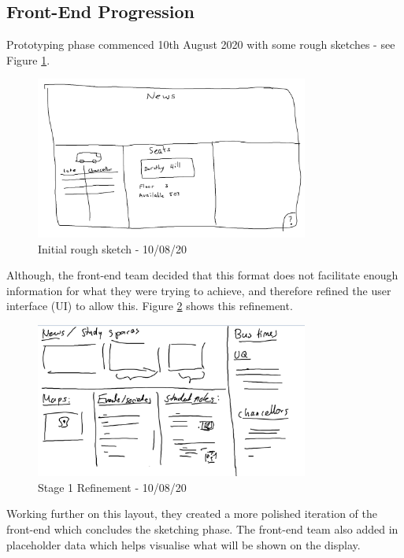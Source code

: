 \documentclass{article}
\begin{document}
	\subsection{Front-End Progression}
		Prototyping phase commenced 10th August 2020 with some rough sketches - see Figure \ref{proto}.
		\begin{figure}[h!]
			\centering
			\includegraphics[width=0.8\textwidth]{Figures/prototype.png}
			\caption{Initial rough sketch - 10/08/20}
			\label{proto}
		\end{figure}
		Although, the front-end team decided that this format does not facilitate enough information for what they were trying to achieve, and therefore refined the user interface (UI) to allow this. Figure \ref{proto2} shows this refinement. \\
		\newpage
		\begin{figure}[h!]
			\centering
			\includegraphics[width=0.8\textwidth]{Figures/prototype2.png}
			\caption{Stage 1 Refinement - 10/08/20}
			\label{proto2}
		\end{figure}
		Working further on this layout, they created a more polished iteration of the front-end which concludes the sketching phase. The front-end team also added in placeholder data which helps visualise what will be shown on the display. \\
		
\end{document}
